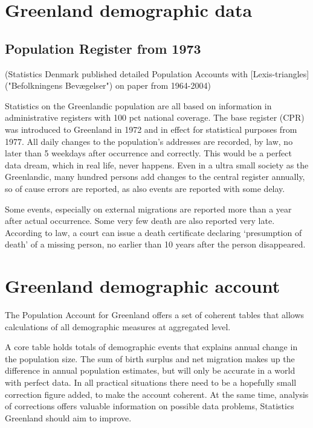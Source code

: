 \documentclass[USenglish]{article}
\begin{document}
\section{Greenland demographic data}

\subsection{Population Register from 1973} 

(Statistics Denmark published detailed Population Accounts with [Lexis-triangles]("Befolkningens Bevægelser") on paper from 1964-2004)

Statistics on the Greenlandic population are all based on information in administrative registers with 100 pct national coverage. The base register (CPR) was introduced to Greenland in 1972 and in effect for statistical purposes from 1977. All daily changes to the population’s addresses are recorded, by law, no later than 5 weekdays after occurrence and correctly. This would be a perfect data dream, which in real life, never happens. Even in a ultra small society as the Greenlandic, many hundred persons add changes to the central register annually, so of cause errors are reported, as also events are reported with some delay.

Some events, especially on external migrations are reported more than a year after actual occurrence. Some very few death are also reported very late. According to law, a court can issue a death certificate declaring ‘presumption of death’ of a missing person, no earlier than 10 years after the person disappeared.



\section{Greenland demographic account}

The Population Account for Greenland offers a set of coherent tables that allows calculations of all demographic measures at aggregated level.

A core table holds totals of demographic events that  explains annual change in the population size. The sum of birth surplus and net migration makes up the difference in annual population estimates, but will only be accurate in a world with perfect data. In all practical situations there need to be a hopefully small correction figure added, to make the account coherent. At the same time, analysis of corrections offers valuable information on possible data problems, Statistics Greenland should aim to improve.
\end{document}
